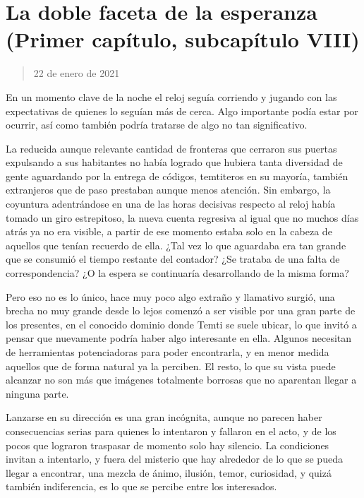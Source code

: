 \documentclass[
  spanish,
]{book}
\begin{document}
\hypertarget{la-doble-faceta-de-la-esperanza-primer-capuxedtulo-subcapuxedtulo-viii}{%
\section{La doble faceta de la esperanza (Primer capítulo, subcapítulo VIII)}\label{la-doble-faceta-de-la-esperanza-primer-capuxedtulo-subcapuxedtulo-viii}}

\begin{quote}
22 de enero de 2021
\end{quote}

En un momento clave de la noche el reloj seguía corriendo y jugando con las expectativas de quienes lo seguían más de cerca. Algo importante podía estar por ocurrir, así como también podría tratarse de algo no tan significativo.

La reducida aunque relevante cantidad de fronteras que cerraron sus puertas expulsando a sus habitantes no había logrado que hubiera tanta diversidad de gente aguardando por la entrega de códigos, temtiteros en su mayoría, también extranjeros que de paso prestaban aunque menos atención.
Sin embargo, la coyuntura adentrándose en una de las horas decisivas respecto al reloj había tomado un giro estrepitoso, la nueva cuenta regresiva al igual que no muchos días atrás ya no era visible, a partir de ese momento estaba solo en la cabeza de aquellos que tenían recuerdo de ella. ¿Tal vez lo que aguardaba era tan grande que se consumió el tiempo restante del contador? ¿Se trataba de una falta de correspondencia? ¿O la espera se continuaría desarrollando de la misma forma?

Pero eso no es lo único, hace muy poco algo extraño y llamativo surgió, una brecha no muy grande desde lo lejos comenzó a ser visible por una gran parte de los presentes, en el conocido dominio donde Temti se suele ubicar, lo que invitó a pensar que nuevamente podría haber algo interesante en ella. Algunos necesitan de herramientas potenciadoras para poder encontrarla, y en menor medida aquellos que de forma natural ya la perciben. El resto, lo que su vista puede alcanzar no son más que imágenes totalmente borrosas que no aparentan llegar a ninguna parte.

Lanzarse en su dirección es una gran incógnita, aunque no parecen haber consecuencias serias para quienes lo intentaron y fallaron en el acto, y de los pocos que lograron traspasar de momento solo hay silencio. La condiciones invitan a intentarlo, y fuera del misterio que hay alrededor de lo que se pueda llegar a encontrar, una mezcla de ánimo, ilusión, temor, curiosidad, y quizá también indiferencia, es lo que se percibe entre los interesados.
\end{document}
